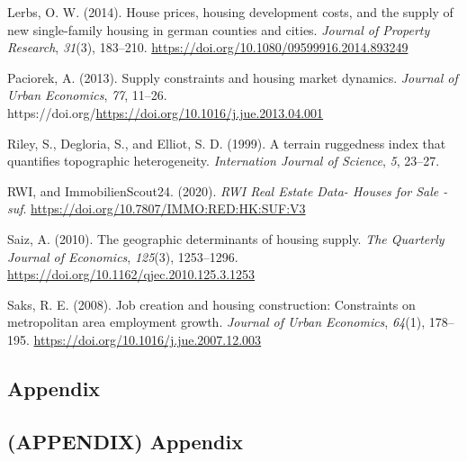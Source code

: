 \documentclass[
  12pt,
]{article}
\newlength{\cslhangindent}
\newenvironment{CSLReferences}[2] %
 {\begin{list}{}{%
  \setlength{\itemindent}{0pt}
  \setlength{\leftmargin}{0pt}
  \setlength{\parsep}{0pt}
  \ifodd #1
   \setlength{\leftmargin}{\cslhangindent}
   \setlength{\itemindent}{-1\cslhangindent}
  \fi
  \setlength{\itemsep}{#2\baselineskip}}}
 {\end{list}}
\begin{document}
\begin{CSLReferences}{1}{0}
Lerbs, O. W. (2014). House prices, housing development costs, and the supply of new single-family housing in german counties and cities. \emph{Journal of Property Research}, \emph{31}(3), 183--210. \url{https://doi.org/10.1080/09599916.2014.893249}

Paciorek, A. (2013). Supply constraints and housing market dynamics. \emph{Journal of Urban Economics}, \emph{77}, 11--26. https://doi.org/\url{https://doi.org/10.1016/j.jue.2013.04.001}

Riley, S., Degloria, S., and Elliot, S. D. (1999). A terrain ruggedness index that quantifies topographic heterogeneity. \emph{Internation Journal of Science}, \emph{5}, 23--27.

RWI, and ImmobilienScout24. (2020). \emph{{RWI Real Estate Data- Houses for Sale - suf}}. \url{https://doi.org/10.7807/IMMO:RED:HK:SUF:V3}

Saiz, A. (2010). The geographic determinants of housing supply. \emph{The Quarterly Journal of Economics}, \emph{125}(3), 1253--1296. \url{https://doi.org/10.1162/qjec.2010.125.3.1253}

Saks, R. E. (2008). Job creation and housing construction: Constraints on metropolitan area employment growth. \emph{Journal of Urban Economics}, \emph{64}(1), 178--195. \url{https://doi.org/10.1016/j.jue.2007.12.003}

\end{CSLReferences}

\newpage

\subsection*{Appendix}\label{appendix}

\subsection*{(APPENDIX) Appendix}\label{appendix-appendix}

\renewcommand\theequation{\thesection.\arabic{equation}}    
\setcounter{equation}{0}

\renewcommand\thefigure{\thesection.\arabic{figure}}    
\setcounter{figure}{0}
\end{document}
